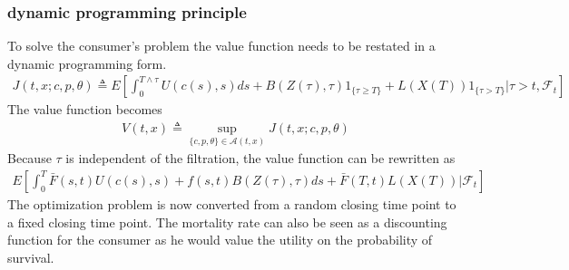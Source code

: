 \documentclass[letterpaper,10pt,english]{jupyterBook}
\begin{document}
\subsubsection{dynamic programming principle}
\label{\detokenize{Financial_application:dynamic-programming-principle}}
\sphinxAtStartPar
To solve the consumer’s problem the value function needs to be restated in a dynamic programming form.
\begin{equation*}
\begin{split}J(t, x; c, p, \theta) \triangleq E \left[\int_0^{T \wedge \tau} U(c(s),s)ds + B(Z(\tau),\tau)1_{\{\tau \ge T\}} + L(X(T))1_{\{\tau>T\}}| \tau> t, \mathcal{F}_t \right] \end{split}
\end{equation*}
\sphinxAtStartPar
The value function becomes
\begin{equation*}
\begin{split} V(t,x) \triangleq \sup_{\{c,p,\theta\} \in \mathcal{A}(t,x)} J(t, x; c, p, \theta)  \end{split}
\end{equation*}
\sphinxAtStartPar
Because \(\tau\) is independent of the filtration, the value function can be rewritten as
\begin{equation*}
\begin{split} E \left[\int_0^T  \bar{F}(s,t)U(c(s),s) + f(s,t)B(Z(\tau),\tau) ds  + \bar{F}(T,t)L(X(T))| \mathcal{F}_t \right]\end{split}
\end{equation*}
\sphinxAtStartPar
The optimization problem is now converted from a random  closing time point to a fixed closing time point. The mortality rate can also be seen as a discounting function for the consumer as he would value the utility on the probability of survival.
\end{document}
